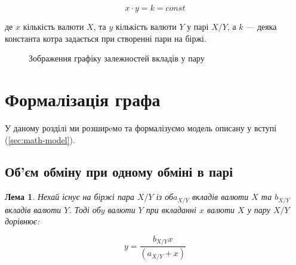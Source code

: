 \documentclass[a4paper, 12pt]{article}
\newcommand{\tqs}{\textquotesingle}
\newtheorem{lemma}{Лема}
\begin{document}
\begin{equation}\label{eq:intro-swap}
	x \cdot y = k = const
\end{equation}

де \(x\) кількість валюти \(X\), та \(y\) кількість валюти \(Y\) у парі \(X/Y\),
а \(k\) --- деяка константа котра задається при створенні пари на біржі.

\begin{figure}[h!]
  \centering
  \caption{Зображення графіку залежностей вкладів у пару}\label{fig:isoquant}
\end{figure}
\newpage

\section{Формалізація графа}

У даному розділі ми розширeмо та формалізуємо модель описану у вступі
(\ref{sec:math-model}).

\subsection{Об'єм обміну при одному обміні в парі}

\begin{lemma} Нехай існує на біржі пара \(X/Y\) із об \(a_{X/Y}\) вкладів
	валюти \(X\) та \(b_{X/Y}\) вкладів валюти \(Y\). Тоді об \(y\) валюти \(Y\)
	при вкладанні \(x\) валюти \(X\) у пару \(X/Y\) дорівнює:

	\begin{equation}\label{eq:swap}
		y = \frac{b_{X/Y}x}{(a_{X/Y} + x)}
	\end{equation}
\end{lemma}
\end{document}
